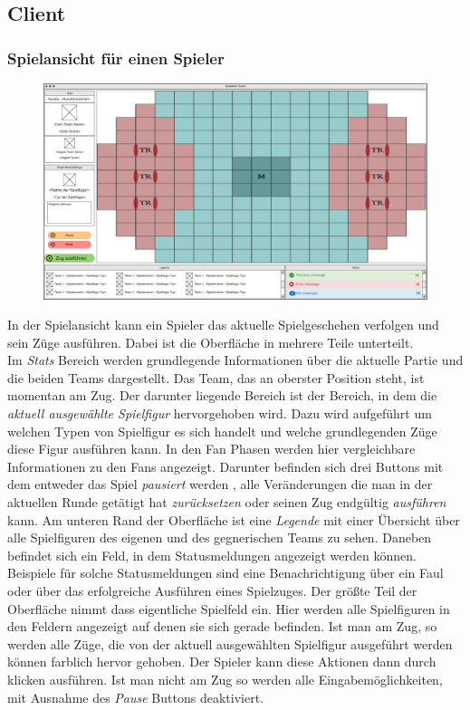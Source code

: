 \subsection{Client}

    \subsubsection{Spielansicht für einen Spieler}

    \begin{figure}[H]
        \centering
        \includegraphics[width=\textwidth]{images/InGamePlayer.PNG}
    \end{figure}

    In der Spielansicht kann ein Spieler das aktuelle Spielgeschehen verfolgen und sein Züge ausführen. Dabei ist die Oberfläche in mehrere Teile unterteilt.\\
    Im \textit{Stats} Bereich werden grundlegende Informationen über die aktuelle Partie und die beiden Teams dargestellt. Das Team, das an oberster Position steht, ist momentan am Zug. Der darunter liegende Bereich ist der Bereich, in dem die \textit{aktuell ausgewählte Spielfigur} hervorgehoben wird. Dazu wird aufgeführt um welchen Typen von Spielfigur es sich handelt und welche grundlegenden Züge diese Figur ausführen kann. In den Fan Phasen werden hier vergleichbare Informationen zu den Fans angezeigt. Darunter befinden sich drei Buttons mit dem entweder das Spiel \textit{pausiert} werden , alle Veränderungen die man in der aktuellen Runde getätigt hat \textit{zurücksetzen} oder seinen Zug endgültig \textit{ausführen} kann. Am unteren Rand der Oberfläche ist eine \textit{Legende} mit einer Übersicht über alle Spielfiguren des eigenen und des gegnerischen Teams zu sehen. Daneben befindet sich ein Feld, in dem Statusmeldungen angezeigt werden können. Beispiele für solche Statusmeldungen sind eine Benachrichtigung über ein Faul oder über das erfolgreiche Ausführen eines Spielzuges. Der größte Teil der Oberfläche nimmt dass eigentliche Spielfeld ein. Hier werden alle Spielfiguren in den Feldern angezeigt auf denen sie sich gerade befinden. Ist man am Zug, so werden alle Züge, die von der aktuell ausgewählten Spielfigur ausgeführt werden können farblich hervor gehoben. Der Spieler kann diese Aktionen dann durch klicken ausführen. Ist man nicht am Zug so werden alle Eingabemöglichkeiten, mit Ausnahme des \textit{Pause} Buttons deaktiviert.
    

